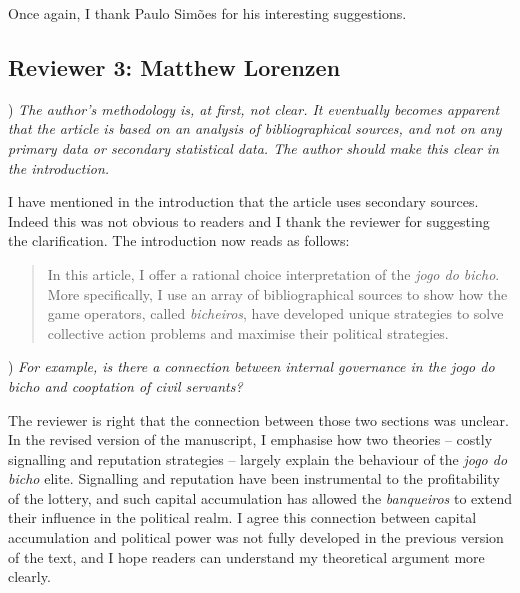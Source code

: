 \documentclass[a4paper,12pt]{article}
\begin{document}
\vspace{.5cm}

Once again, I thank Paulo Simões for his interesting suggestions.

\newpage

\subsection*{Reviewer 3: Matthew Lorenzen}%
\label{sub:reviewer_3_matthew_lorenzen}

) \textit{The author's methodology is, at first, not clear. It eventually becomes apparent that the article is based on an analysis of bibliographical sources, and not on any primary data or secondary statistical data. The author should make this clear in the introduction.}

\vspace{.25cm}

I have mentioned in the introduction that the article uses secondary sources. Indeed this was not obvious to readers and I thank the reviewer for suggesting the clarification. The introduction now reads as follows:

\begin{quote}
	In this article, I offer a rational choice interpretation of the \emph{jogo do bicho}. More specifically, I use an array of bibliographical sources to show how the game operators, called \emph{bicheiros}, have developed unique strategies to solve collective action problems and maximise their political strategies.
\end{quote}

\vspace{.5cm}

) \textit{For example, is there a connection between internal governance in the jogo do bicho and cooptation of civil servants?}

\vspace{.25cm}

The reviewer is right that the connection between those two sections was unclear. In the revised version of the manuscript, I emphasise how two theories -- costly signalling and reputation strategies -- largely explain the behaviour of the \textit{jogo do bicho} elite. Signalling and reputation have been instrumental to the profitability of the lottery, and such capital accumulation has allowed the \textit{banqueiros} to extend their influence in the political realm. I agree this connection between capital accumulation and political power was not fully developed in the previous version of the text, and I hope readers can understand my theoretical argument more clearly. 
\end{document}
